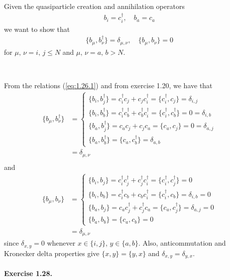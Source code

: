 \documentclass[12pt]{article}
\newcommand{\eq}[1]{{\begin{align*}#1\end{align*}}}
\newcommand{\equ}[1]{{\begin{align}#1\end{align}}}
\newcommand{\da}{\dagger}
\begin{document}
\begin{itshape}
    Given the quasiparticle creation and annihilation operators
    \equ{b_i = c_i^\da, \quad b_a = c_a\label{eq:1.26.1}}
    we want to show that
    \eq{\{b_\mu,b_\nu^\da\} = \delta_{\mu,\nu},\quad \{b_\mu,b_\nu\} = 0}
    for $\mu,\,\nu = i,\,j \leq N$ and $\mu,\,\nu = a,\,b > N$.
\end{itshape}\\
\begin{tcolorbox}[title = Exercise 1.26. // Solution, breakable]
    From the relations (\ref{eq:1.26.1}) and from exercise 1.20, we 
    have that
    \begin{align*}
	    \{b_\mu,b_\nu^\da\} &=
	    \begin{cases}
	        \{b_i,b_j^\da\} = c_i^\da c_j + c_j c_i^\da = \{c_i^\da,c_j\} = \delta_{i,j}\\
	        \{b_i,b_b^\da\} = c_i^\da c_b^\da + c_b^\da c_i^\da = \{c_i^\da,c_b^\da\} = 0
	            = \delta_{i,b}\\
	        \{b_a,b_j^\da\} = c_a c_j + c_j c_a = \{c_a,c_j\} = 0
	            = \delta_{a,j}\\
	        \{b_a,b_b^\da\} = \{c_a,c_b^\da\} = \delta_{a,b}
        \end{cases}\\
        &= \delta_{\mu,\nu}\\
    \end{align*}
    and
    \begin{align*}
	     \{b_\mu,b_\nu\} &=
	    \begin{cases}
	        \{b_i,b_j\} = c_i^\da c_j^\da + c_j^\da c_i^\da 
	            = \{c_i^\da,c_j^\da\} = 0 \\
	        \{b_i,b_b\} = c_i^\da c_b + c_b c_i^\da = \{c_i^\da,c_b\} = \delta_{i,b} = 0\\
	        \{b_a,b_j\} = c_a c_j^\da + c_j^\da c_a = \{c_a,c_j^\da\} = \delta_{a,j} = 0\\
	        \{b_a,b_b\} = \{c_a,c_b\} = 0
        \end{cases}\\
        &= \delta_{\mu,\nu}
    \end{align*}
    since $\delta_{x,y} = 0$ whenever $x\in\{i,j\}$, $y\in\{a,b\}$.
    Also, anticommutation and Kronecker delta properties give
    $\{x,y\} = \{y,x\}$ and $\delta_{x,y} = \delta_{y,x}$.
\end{tcolorbox}

\paragraph{Exercise 1.28.}
\label{par:ex1.28}
\end{document}
